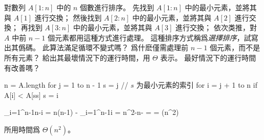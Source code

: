 對數列 $A[1:n]$ 中的 $n$ 個數進行排序。
先找到 $A[1:n]$ 中的最小元素，並將其與 $A[1]$ 進行交換；
然後找到 $A[2:n]$ 中的最小元素，並將其與 $A[2]$ 進行交換；
再找到 $A[3:n]$ 中的最小元素，並將其與 $A[3]$ 進行交換；
依次类推，對 $A$ 中前 $n-1$ 個元素都用這種方式進行處理。
這種排序方式稱爲\emph{選擇排序}，試寫出其僞碼。
此算法滿足循環不變式嗎？
爲什麽僅需處理前 $n-1$ 個元素，而不是所有元素？
給出其最壞情況下的運行時間，用 $\Theta$ 表示。
最好情況下的運行時間有改善嗎？
\stopEXERCISE

\startANSWER
\startCLRSCODE
n = A.length
for j = 1 to n - 1
	s = j	// $s$ 为最小元素的索引
	for i = j + 1 to n
		if A[i] < A[ss]
			s = i
\stopCLRSCODE

\startsplitformula
\startmathalignment[n=2]
\NC \NC\sum_{i=1}^{n-1}n-i \NR
\NC = \NC n(n-1) - \sum_{i=1}^{n-1}i \NR
\NC = \NC n^2-n- \NR
\NC = \NC {} \NR
\NC = \NC \Theta(n^2) \NR
\stopmathalignment
\stopsplitformula

所用時間爲 $\Theta(n^2)$。
\stopANSWER
